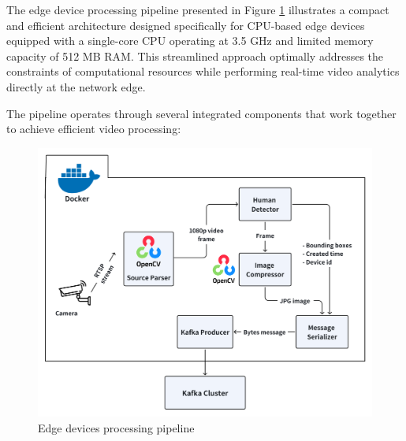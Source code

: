 The edge device processing pipeline presented in Figure \ref{fig:edges} illustrates a compact and efficient architecture designed specifically for CPU-based edge devices equipped with a single-core CPU operating at 3.5 GHz and limited memory capacity of 512 MB RAM. This streamlined approach optimally addresses the constraints of computational resources while performing real-time video analytics directly at the network edge.

The pipeline operates through several integrated components that work together to achieve efficient video processing:

\begin{figure}[htbp]
    \centering
    \includegraphics[width=1\textwidth]{Figure/edges.png}
    \caption{Edge devices processing pipeline}
    \label{fig:edges}
\end{figure}

